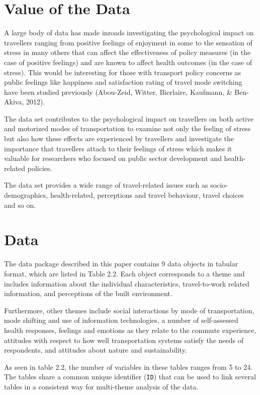 \documentclass[
11pt, %
oneside, %
english, %
singlespacing, %
]{macthesis} %
\begin{document}
\hypertarget{value-of-the-data}{%
\section{Value of the Data}\label{value-of-the-data}}

A large body of data has made inroads investigating the psychological impact on travellers ranging from positive feelings of enjoyment in some to the sensation of stress in many others that can affect the effectiveness of policy measures (in the case of positive feelings) and are known to affect health outcomes (in the case of stress). This would be interesting for those with transport policy concerns as public feelings like happiness and satisfaction rating of travel mode switching have been studied previously (Abou-Zeid, Witter, Bierlaire, Kaufmann, \& Ben-Akiva, 2012).

The data set contributes to the psychological impact on travellers on both active and motorized modes of transportation to examine not only the feeling of stress but also how these effects are experienced by travellers and investigate the importance that travellers attach to their feelings of stress which makes it valuable for researchers who focused on public sector development and health-related policies.

The data set provides a wide range of travel-related issues such as socio-demographics, health-related, perceptions and travel behaviour, travel choices and so on.

\hypertarget{data}{%
\section{Data}\label{data}}

The data package described in this paper contains 9 data objects in tabular format, which are listed in Table 2.2. Each object corresponds to a theme and includes information about the individual characteristics, travel-to-work related information, and perceptions of the built environment.

Furthermore, other themes include social interactions by mode of transportation, mode shifting and use of information technologies, a number of self-assessed health responses, feelings and emotions as they relate to the commute experience, attitudes with respect to how well transportation systems satisfy the needs of respondents, and attitudes about nature and sustainability.

As seen in table 2.2, the number of variables in these tables ranges from 5 to 24. The tables share a common unique identifier (\texttt{ID}) that can be used to link several tables in a consistent way for multi-theme analysis of the data.
\end{document}
